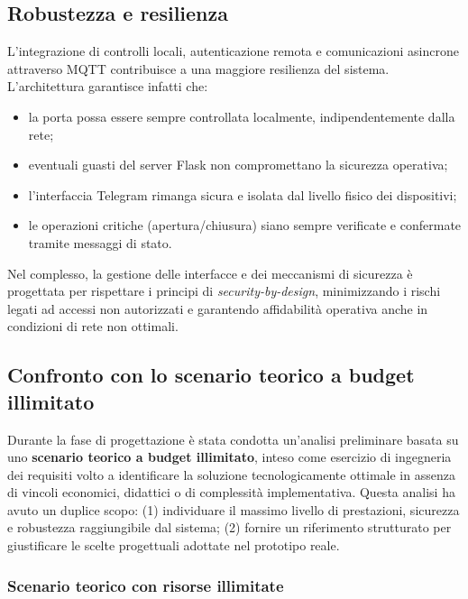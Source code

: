 \subsection*{Robustezza e resilienza}

L’integrazione di controlli locali, autenticazione remota e comunicazioni asincrone attraverso MQTT contribuisce a una maggiore resilienza del sistema.
L’architettura garantisce infatti che:

\begin{itemize}
\item la porta possa essere sempre controllata localmente, indipendentemente dalla rete;
\item eventuali guasti del server Flask non compromettano la sicurezza operativa;
\item l’interfaccia Telegram rimanga sicura e isolata dal livello fisico dei dispositivi;
\item le operazioni critiche (apertura/chiusura) siano sempre verificate e confermate tramite messaggi di stato.
\end{itemize}

Nel complesso, la gestione delle interfacce e dei meccanismi di sicurezza è progettata per rispettare i principi di \textit{security-by-design}, minimizzando i rischi legati ad accessi non autorizzati e garantendo affidabilità operativa anche in condizioni di rete non ottimali.


\subsection{Confronto con lo scenario teorico a budget illimitato}

Durante la fase di progettazione è stata condotta un’analisi preliminare basata su uno \textbf{scenario teorico a budget illimitato}, inteso come esercizio di ingegneria dei requisiti volto a identificare la soluzione tecnologicamente ottimale in assenza di vincoli economici, didattici o di complessità implementativa.
Questa analisi ha avuto un duplice scopo:
(1) individuare il massimo livello di prestazioni, sicurezza e robustezza raggiungibile dal sistema;
(2) fornire un riferimento strutturato per giustificare le scelte progettuali adottate nel prototipo reale.

\subsubsection*{Scenario teorico con risorse illimitate}


